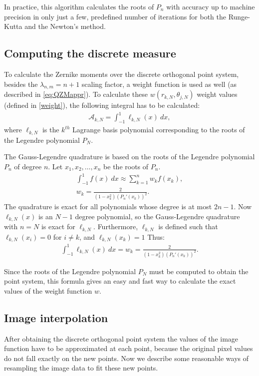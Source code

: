In practice, this algorithm calculates the roots of $P_n$ with accuracy up to machine precision in only just a few, predefined number of iterations for both the Runge-Kutta and the Newton's method.

\subsection{Computing the discrete measure}
To calculate the Zernike moments over the discrete orthogonal point system, besides the $\lambda_{n,m} = n + 1$ scaling factor, a weight function is used as well (as described in \eqref{eq:QZMappr}). To calculate these $w(r_{k,N},\theta_{j,N})$ weight values (defined in \eqref{weight}), the following integral has to be calculated:
\begin{gather*}
    \mathcal{A}_{k,N} = \int_{-1}^{1}\ell_{k,N}(x)\ dx,
\end{gather*}
where $\ell_{k,N}$ is the $k^{th}$ Lagrange basis polynomial corresponding to the roots of the Legendre polynomial $P_N$.

The Gauss-Legendre quadrature is based on the roots of the Legendre polynomial $P_n$ of degree $n$. Let $x_1,x_2,\ldots,x_n$ be the roots of $P_n$.
\begin{gather*}
    \int_{-1}^{1}f(x)\ dx \approx \sum_{k=1}^n w_k f(x_k), \\
    w_k = \frac{2}{(1-x_k^2)(P_n'(x_k))^2}.
\end{gather*}
The quadrature is exact for all polynomials whose degree is at most $2n-1$. Now $\ell_{k,N}(x)$ is an $N-1$ degree polynomial, so the Gauss-Legendre quadrature with $n=N$ is exact for $\ell_{k,N}$. Furthermore, $\ell_{k,N}$ is defined such that $\ell_{k,N}(x_i) = 0$ for $i \neq k$, and $\ell_{k,N}(x_k) = 1$ Thus:
\begin{gather*}
    \int_{-1}^{1}\ell_{k,N}(x)\ dx = w_k = \frac{2}{(1-x_k^2)(P_n'(x_k))^2}.
\end{gather*}

Since the roots of the Legendre polynomial $P_N$ must be computed to obtain the point system, this formula gives an easy and fast way to calculate the exact values of the weight function $w$.

\subsection{Image interpolation}
After obtaining the discrete orthogonal point system the values of the image function have to be approximated at each point, because the original pixel values do not fall exactly on the new points. Now we describe some reasonable ways of resampling the image data to fit these new points.

